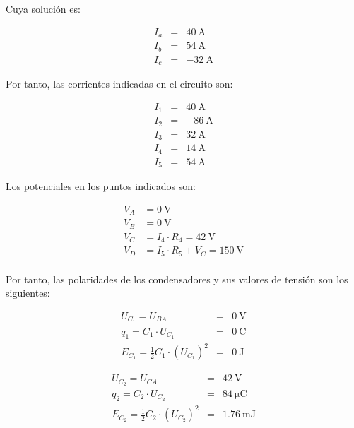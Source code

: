Cuya solución es:

\vspace{-6mm}
\begin{eqnarray*}
I_a & = & \qty{40}{\ampere}\\
I_b & = & \qty{54}{\ampere}\\
I_c & = & -\qty{32}{\ampere}
\end{eqnarray*}

Por tanto, las corrientes indicadas en el circuito son:

\vspace{-4mm}
\begin{eqnarray*}
I_1 & = & \qty{40}{\ampere}\\
I_2 & = & \qty{-86}{\ampere}\\
I_3 & = &  \qty{32}{\ampere}\\
I_4 & = &  \qty{14}{\ampere}\\
I_5 & = &  \qty{54}{\ampere}
\end{eqnarray*}

Los potenciales en los puntos indicados son:

\vspace{-4mm}
\begin{align*}
V_A &= \qty{0}{\volt}\\
V_B &= \qty{0}{\volt}\\
V_C &= I_4 \cdot R_4 = \qty{42}{\volt}\\
V_D &= I_5 \cdot R_5 + V_C = \qty{150}{\volt}\\
\end{align*}

Por tanto, las polaridades de los condensadores y sus valores de tensión son los siguientes:

\vspace{-3mm}
\begin{eqnarray*}
    U_{C_1} = U_{BA} & = & \qty{0}{\volt}\\
    q_1 = C_1 \cdot U_{C_1} & = & \boxed{\qty{0}{\coulomb}}\\
    E_{C_1} = \frac{1}{2} C_1 \cdot (U_{C_1})^2 & = & \boxed{\qty{0}{\joule}}
\end{eqnarray*}

\vspace{-4mm}
\begin{eqnarray*}
    U_{C_2} = U_{CA} & = & \qty{42}{\volt}\\
    q_2 = C_2 \cdot U_{C_2} & = & \boxed{\qty{84}{\micro\coulomb}}\\
    E_{C_2} = \frac{1}{2} C_2 \cdot (U_{C_2})^2 & = & \boxed{\qty{1.76}{\milli\joule}}
\end{eqnarray*}

